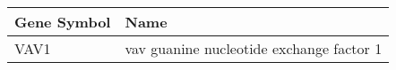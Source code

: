 \begin{tabular}{ll}
\toprule
Gene Symbol &                                     Name \\
\midrule
       VAV1 & vav guanine nucleotide exchange factor 1 \\
\bottomrule
\end{tabular}
